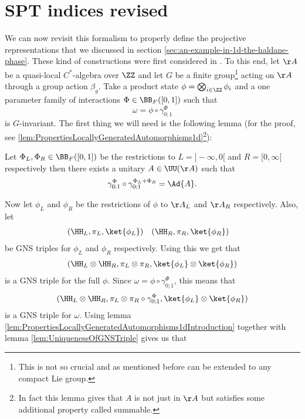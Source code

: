 \section{SPT indices revised}\label{sec:SPT_Indices_Revised}
We can now revisit this formalism to properly define the projective representations that we discussed in section \ref{sec:an-example-in-1d-the-haldane-phase}. These kind of constructions were first considered in \cite{ogata2021classification}. To this end, let $\AA$ be a quasi-local $C^*$-algebra over $\ZZ$ and let $G$ be a finite group\footnote{This is not so crucial and as mentioned before can be extended to any compact Lie group.} acting on $\AA$ through a group action $\beta_g$. Take a product state $\phi=\bigotimes_{i\in\ZZ}\phi_i$ and a one parameter family of interactions $\Phi\in \BB_F([0,1])$ such that
\begin{equation}
\omega=\phi\circ\gamma^\Phi_{0;1}
\end{equation}
is $G$-invariant. The first thing we will need is the following lemma (for the proof, see \ref{lem:PropertiesLocallyGeneratedAutomorphisms1d}\footnote{In fact this lemma gives that $A$ is not just in $\AA$ but satisfies some additional property called summable.}):
\begin{lemma}\label{lem:PropertiesLocallyGeneratedAutomorphisms1dIntroduction}
	Let $\Phi_L,\Phi_R\in\BB_F([0,1])$ be the restrictions to $L=]-\infty,0[$ and $R=[0,\infty[$ respectively then there exists a unitary $A\in\UU(\AA)$ such that
	\begin{equation}
	\gamma^\Phi_{0;1}\circ\gamma^{\Phi_L+\Phi_R}_{0;1}=\Ad{A}.
	\end{equation}
\end{lemma}
Now let $\phi_L$ and $\phi_R$ be the restrictions of $\phi$ to $\AA_L$ and $\AA_R$ respectively. Also, let
\begin{align}
&(\HH_L,\pi_L,\ket{\phi_L})&&(\HH_R,\pi_R,\ket{\phi_R})
\end{align}
be GNS triples for $\phi_L$ and $\phi_R$ respectively. Using this we get that
\begin{align}
(\HH_L\otimes\HH_R,\pi_L\otimes\pi_R,\ket{\phi_L}\otimes\ket{\phi_R})
\end{align}
is a GNS triple for the full $\phi$. Since $\omega=\phi\circ\gamma^\Phi_{0;1}$, this means that
\begin{equation}
(\HH_L\otimes\HH_R,\pi_L\otimes\pi_R\circ\gamma^\Phi_{0;1},\ket{\phi_L}\otimes\ket{\phi_R})
\end{equation}
is a GNS triple for $\omega$. Using lemma \ref{lem:PropertiesLocallyGeneratedAutomorphisms1dIntroduction} together with lemma \ref{lem:UniquenessOfGNSTriple} gives us that
